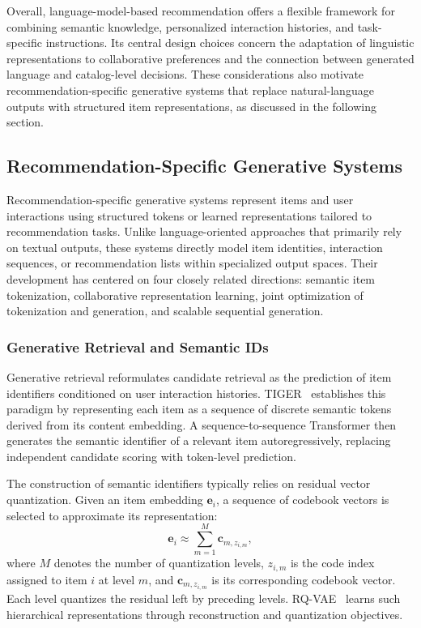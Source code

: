\documentclass[sigconf,nonacm]{acmart}
\begin{document}
Overall, language-model-based recommendation offers a flexible
framework for combining semantic knowledge, personalized
interaction histories, and task-specific instructions.
Its central design choices concern the adaptation of linguistic
representations to collaborative preferences and the connection
between generated language and catalog-level decisions.
These considerations also motivate recommendation-specific
generative systems that replace natural-language outputs
with structured item representations, as discussed in the
following section.



\subsection{Recommendation-Specific Generative Systems}
\label{sec:rec}

Recommendation-specific generative systems represent items and
user interactions using structured tokens or learned
representations tailored to recommendation tasks. Unlike
language-oriented approaches that primarily rely on textual
outputs, these systems directly model item identities,
interaction sequences, or recommendation lists within
specialized output spaces. Their development has centered
on four closely related directions: semantic item
tokenization, collaborative representation learning,
joint optimization of tokenization and generation, and
scalable sequential generation.

\subsubsection{Generative Retrieval and Semantic IDs}

Generative retrieval reformulates candidate retrieval as
the prediction of item identifiers conditioned on user
interaction histories. TIGER~\cite{tiger} establishes
this paradigm by representing each item as a sequence
of discrete semantic tokens derived from its content
embedding. A sequence-to-sequence Transformer then
generates the semantic identifier of a relevant item
autoregressively, replacing independent candidate
scoring with token-level prediction.

The construction of semantic identifiers typically
relies on residual vector quantization. Given an item
embedding $\mathbf{e}_i$, a sequence of codebook
vectors is selected to approximate its representation:
\begin{equation}
    \mathbf{e}_i \approx
    \sum_{m=1}^{M}
    \mathbf{c}_{m,z_{i,m}},
    \label{eq:semantic_quantization}
\end{equation}
where $M$ denotes the number of quantization levels,
$z_{i,m}$ is the code index assigned to item $i$ at
level $m$, and $\mathbf{c}_{m,z_{i,m}}$ is its
corresponding codebook vector. Each level quantizes
the residual left by preceding levels. RQ-VAE~\cite{rqvae}
learns such hierarchical representations through
reconstruction and quantization objectives.
\end{document}
